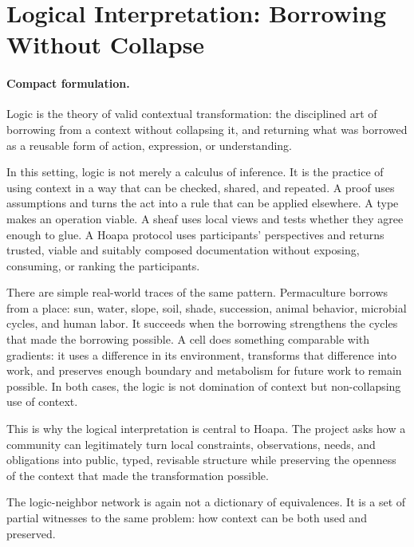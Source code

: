 \documentclass[11pt]{article}
\begin{document}
\section{Logical Interpretation: Borrowing Without Collapse}

\paragraph{Compact formulation.}
Logic is the theory of valid contextual transformation: the disciplined art of
borrowing from a context without collapsing it, and returning what was borrowed
as a reusable form of action, expression, or understanding.

In this setting, logic is not merely a calculus of inference. It is the
practice of using context in a way that can be checked, shared, and repeated. A
proof uses assumptions and turns the act into a rule that can be applied
elsewhere. A type makes an operation viable. A sheaf uses local views and tests
whether they agree enough to glue. A Hoapa protocol uses participants'
perspectives and returns trusted, viable and suitably composed documentation
without exposing, consuming, or ranking the participants.

There are simple real-world traces of the same pattern. Permaculture borrows
from a place: sun, water, slope, soil, shade, succession, animal behavior,
microbial cycles, and human labor. It succeeds when the borrowing strengthens
the cycles that made the borrowing possible. A cell does something comparable
with gradients: it uses a difference in its environment, transforms that
difference into work, and preserves enough boundary and metabolism for future
work to remain possible. In both cases, the logic is not domination of context
but non-collapsing use of context.

This is why the logical interpretation is central to Hoapa. The project asks
how a community can legitimately turn local constraints, observations, needs,
and obligations into public, typed, revisable structure while preserving the
openness of the context that made the transformation possible.

The logic-neighbor network is again not a dictionary of equivalences. It is a
set of partial witnesses to the same problem: how context can be both used and
preserved.
\end{document}
